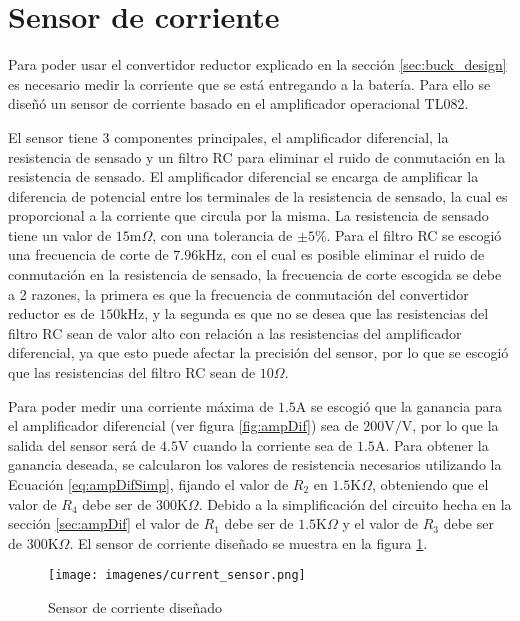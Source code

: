 \section{Sensor de corriente}

    Para poder usar el convertidor reductor explicado en la sección
    \ref{sec:buck_design} es necesario medir la corriente que se
    está entregando a la batería. Para ello se diseñó un sensor de corriente
    basado en el amplificador operacional TL082.

    El sensor tiene 3 componentes principales, el amplificador diferencial, 
    la resistencia de sensado y un filtro RC para eliminar el ruido de conmutación
    en la resistencia de sensado. El amplificador diferencial se encarga de 
    amplificar la diferencia de potencial entre los terminales de la resistencia
    de sensado, la cual es proporcional a la corriente que circula por la misma.
    La resistencia de sensado tiene un valor de $15 \text{m}\Omega$, con una
     tolerancia de $\pm 5\%$. Para el filtro RC se escogió una frecuencia de corte
     de $7.96\text{kHz}$, con el cual es posible eliminar el ruido de conmutación
    en la resistencia de sensado, la frecuencia de corte escogida
    se debe a 2 razones, la primera es que la frecuencia de conmutación del
    convertidor reductor es de $150\text{kHz}$, y la segunda es que no se desea
    que las resistencias del filtro RC sean de valor alto con relación a las
    resistencias del amplificador diferencial, ya que esto puede afectar la
    precisión del sensor, por lo que se escogió que las resistencias del filtro
    RC sean de $10\Omega$.

    Para poder medir una corriente máxima de $1.5\text{A}$ se escogió que 
    la ganancia para el amplificador diferencial (ver figura \ref{fig:ampDif})
    sea de $200\text{V/V}$, por lo que la salida del sensor será de
    $4.5\text{V}$ cuando la corriente sea de $1.5\text{A}$. Para obtener
    la ganancia deseada, se calcularon los valores de resistencia 
    necesarios utilizando la Ecuación \ref{eq:ampDifSimp}, fijando 
    el valor de $R_2$ en
    $1.5\text{K}\Omega$, obteniendo que el valor de $R_4$ debe ser de 
    $300\text{K}\Omega$. Debido a la  simplificación del circuito hecha en la 
    sección \ref{sec:ampDif} el valor de $R_1$ debe ser de $1.5\text{K}\Omega$
    y el valor de $R_3$ debe ser de $300\text{K}\Omega$. El sensor de corriente 
    diseñado se muestra en la figura \ref{fig:sensor_corriente}.

    \begin{figure}[H]
        \centering
        \texttt{[image: imagenes/current\_sensor.png]}
        \caption{Sensor de corriente diseñado}
        \label{fig:sensor_corriente}
    \end{figure}

